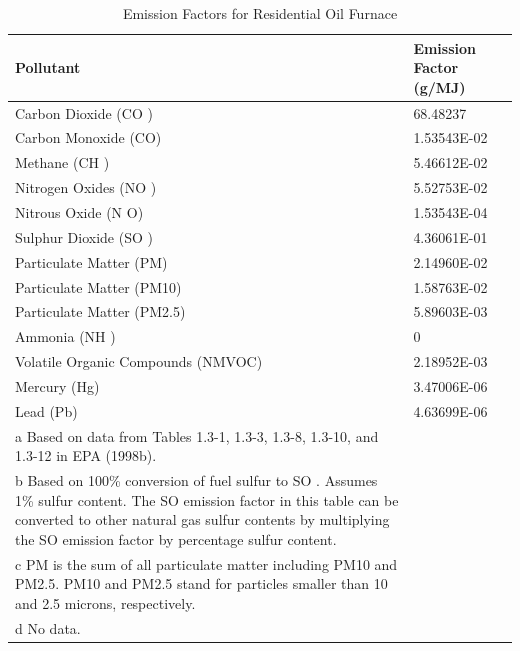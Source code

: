 \begin{longtable}[c]{p{4.5in}p{1.5in}}
\caption{  Emission Factors for Residential Oil Furnace \protect \label{table:emission-factors-for-residential-oil-furnace}}\\
\toprule 
Pollutant & Emission Factor  ~~ (g/MJ) \tabularnewline \midrule
\endhead
Carbon Dioxide (CO  ) & 68.48237 \tabularnewline
Carbon Monoxide (CO) & 1.53543E-02 \tabularnewline
Methane (CH  ) & 5.46612E-02 \tabularnewline
Nitrogen Oxides (NO  ) & 5.52753E-02 \tabularnewline
Nitrous Oxide (N  O) & 1.53543E-04 \tabularnewline
Sulphur Dioxide (SO  ) & 4.36061E-01 \tabularnewline
Particulate Matter (PM) & 2.14960E-02 \tabularnewline
Particulate Matter (PM10) & 1.58763E-02 \tabularnewline
Particulate Matter (PM2.5) & 5.89603E-03 \tabularnewline
Ammonia (NH  ) & 0 \tabularnewline
Volatile Organic Compounds (NMVOC) & 2.18952E-03 \tabularnewline
Mercury (Hg) & 3.47006E-06 \tabularnewline
Lead (Pb) & 4.63699E-06 \tabularnewline
a Based on data from Tables 1.3-1, 1.3-3, 1.3-8, 1.3-10, and 1.3-12 in EPA (1998b). \tabularnewline
b Based on 100\% conversion of fuel sulfur to SO  . Assumes 1\% sulfur content. The SO   emission factor in this table can be converted to other natural gas sulfur contents by multiplying the SO   emission factor by percentage sulfur content. \tabularnewline
c PM is the sum of all particulate matter including PM10 and PM2.5. PM10 and PM2.5 stand for particles smaller than 10 and 2.5 microns, respectively. \tabularnewline
d No data. \tabularnewline
\bottomrule
\end{longtable}

